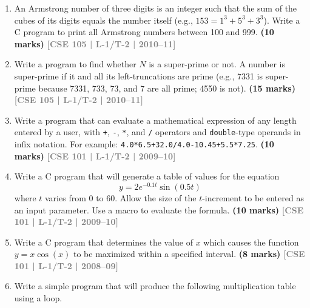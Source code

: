 \documentclass[12pt,a3paper]{article}
\newcommand{\yr}[1]{\hfill\textcolor{gray}{\small\textbf{[#1]}}}
\newcommand{\mk}[1]{\textcolor{orange!70!black}{\small\textbf{(#1 marks)}}}
\begin{document}
\begin{enumerate}
\begin{center}
\end{center}

\noindent
Write an iterative C function for implementing the flowchart stated in the figure.

\mk{10} \yr{CSE 105 | L-1/T-2 | 2011--12}

\item An Armstrong number of three digits is an integer such that the sum of the cubes of its digits equals the number itself (e.g., $153 = 1^3 + 5^3 + 3^3$). Write a C program to print all Armstrong numbers between 100 and 999.
\mk{10} \yr{CSE 105 | L-1/T-2 | 2010--11}

\item Write a program to find whether $N$ is a super-prime or not. A number is super-prime if it and all its left-truncations are prime (e.g., 7331 is super-prime because 7331, 733, 73, and 7 are all prime; 4550 is not).
\mk{15} \yr{CSE 105 | L-1/T-2 | 2010--11}

\item Write a program that can evaluate a mathematical expression of any length entered by a user, with \texttt{+}, \texttt{-}, \texttt{*}, and \texttt{/} operators and \texttt{double}-type operands in infix notation. For example: \texttt{4.0*6.5+32.0/4.0-10.45+5.5*7.25}.
\mk{10} \yr{CSE 101 | L-1/T-2 | 2009--10}

\item Write a C program that will generate a table of values for the equation
\[ y = 2e^{-0.1t} \sin(0.5t) \]
where $t$ varies from 0 to 60. Allow the size of the $t$-increment to be entered as an input parameter. Use a macro to evaluate the formula.
\mk{10} \yr{CSE 101 | L-1/T-2 | 2009--10}

\item Write a C program that determines the value of $x$ which causes the function $y = x\cos(x)$ to be maximized within a specified interval.
\mk{8} \yr{CSE 101 | L-1/T-2 | 2008--09}

\item Write a simple program that will produce the following multiplication table using a loop.


\end{enumerate}
\end{document}
